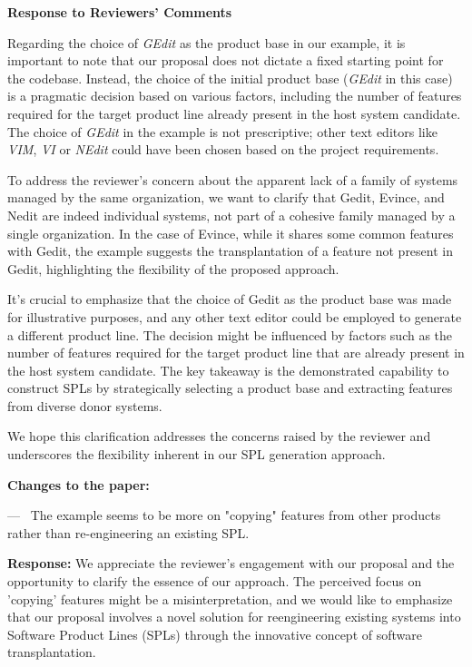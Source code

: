 \documentclass[a4paper,11pt]{letter}
\newcounter{reviewer}
\newcounter{point}[reviewer]
\renewcommand{\thepoint}{P\,\thereviewer.\arabic{point}}
\newenvironment{point}
   {\refstepcounter{point} \bigskip \noindent {\textbf{Reviewer~Point~\thepoint} } ---\ }
   {\par }
\newcommand{\response}[1]{\textbf{Response:} \begingroup\color{black}#1\endgroup}
\newcommand{\changes}[1]{\textbf{Changes to the paper:} \begingroup\color{blue}#1\endgroup}
\begin{document}
\begin{letter}{\textbf{Response to Reviewers' Comments}}
{Regarding the choice of \emph{GEdit} as the product base in our example, it is important to note that our proposal does not dictate a fixed starting point for the codebase. Instead, the choice of the initial product base (\emph{GEdit} in this case) is a pragmatic decision based on various factors, including the number of features required for the target product line already present in the host system candidate. The choice of \emph{GEdit} in the example is not prescriptive; other text editors like \emph{VIM}, \emph{VI} or \emph{NEdit} could have been chosen based on the project requirements. 

To address the reviewer's concern about the apparent lack of a family of systems managed by the same organization, we want to clarify that Gedit, Evince, and Nedit are indeed individual systems, not part of a cohesive family managed by a single organization. In the case of Evince, while it shares some common features with Gedit, the example suggests the transplantation of a feature not present in Gedit, highlighting the flexibility of the proposed approach.

It's crucial to emphasize that the choice of Gedit as the product base was made for illustrative purposes, and any other text editor could be employed to generate a different product line. The decision might be influenced by factors such as the number of features required for the target product line that are already present in the host system candidate. The key takeaway is the demonstrated capability to construct SPLs by strategically selecting a product base and extracting features from diverse donor systems.

We hope this clarification addresses the concerns raised by the reviewer and underscores the flexibility inherent in our SPL generation approach.}

\changes{}

\begin{point} 
The example seems to be more on "copying" features from other products rather than re-engineering an existing SPL. 
\end{point}

\response{We appreciate the reviewer's engagement with our proposal and the opportunity to clarify the essence of our approach. The perceived focus on 'copying' features might be a misinterpretation, and we would like to emphasize that our proposal involves a novel solution for reengineering existing systems into Software Product Lines (SPLs) through the innovative concept of software transplantation.

}
\end{letter}
\end{document}
